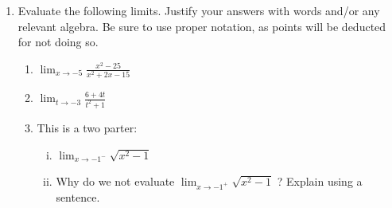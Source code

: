 \documentclass[11pt]{amsart}
\theoremstyle{definition}
\theoremstyle{remark}
\newcommand\be{\begin{enumerate}}
\newcommand\ee{\end{enumerate}}
\renewcommand{\d}{\displaystyle}
\theoremstyle{comment}
\begin{document}
\begin{enumerate}
\begin{enumerate}

\item What is the domain of $f(x)$? Give your answer in interval form.\\



\item Where in the domain of $f(x)$ is the function continuous? Give your answer in interval form.



\end{enumerate}



\item Evaluate the following limits. Justify your
answers with words and/or any relevant algebra. Be sure to use proper
notation, as points will be deducted for not doing so. 


\be
\item  $\d \lim_{x \to -5} \frac{x^2-25}{x^2+2x-15}$

\item $\d \lim_{t \to -3} \frac{6+4t}{t^2+1}$


\item This is a two parter:
\be[(i)] 
\item $ \d \lim_{x \to -1^-} \sqrt{x^2-1}$
\item Why do we not evaluate $ \d \lim_{x \to -1^+} \sqrt{x^2-1}$ ? Explain using a sentence.
\ee
%
\ee


\end{enumerate}
\end{document}
